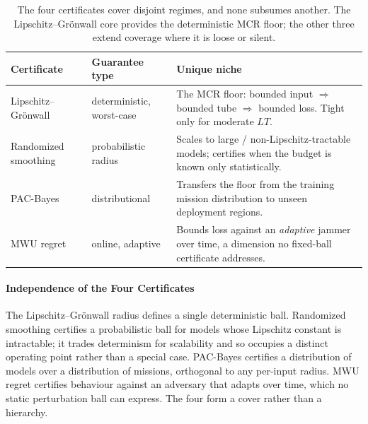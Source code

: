 \begin{table}[t]
\centering
\caption{The four certificates cover disjoint regimes, and none subsumes
another. The Lipschitz--Gr\"onwall core provides the deterministic MCR floor;
the other three extend coverage where it is loose or silent.}
\label{tab:certs}
\small
\renewcommand{\arraystretch}{1.05}
\begin{tabularx}{\columnwidth}{@{}
  >{\hsize=0.82\hsize\raggedright\arraybackslash}X
  >{\hsize=0.70\hsize\raggedright\arraybackslash}X
  >{\hsize=1.48\hsize\raggedright\arraybackslash}X@{}}
\toprule
\textbf{Certificate} & \textbf{Guarantee type} & \textbf{Unique niche}\\
\midrule
Lipschitz--Gr\"onwall & deterministic, worst-case & The MCR floor: bounded input $\Rightarrow$ bounded tube $\Rightarrow$ bounded loss. Tight only for moderate $LT$.\\
Randomized smoothing~\cite{cohen2019smoothing} & probabilistic radius & Scales to large / non-Lipschitz-tractable models; certifies when the budget is known only statistically.\\
PAC-Bayes~\cite{viallard2021pacbayes} & distributional & Transfers the floor from the training mission distribution to unseen deployment regions.\\
MWU regret~\cite{arora2012mwu,balcan2015commitment} & online, adaptive & Bounds loss against an \emph{adaptive} jammer over time, a dimension no fixed-ball certificate addresses.\\
\bottomrule
\end{tabularx}
\end{table}

\paragraph{Independence of the Four Certificates}
The Lipschitz--Gr\"onwall radius defines a single deterministic ball.
Randomized smoothing certifies a probabilistic ball for models whose Lipschitz
constant is intractable; it trades determinism for scalability and so occupies
a distinct operating point rather than a special case. PAC-Bayes certifies a
distribution of models over a distribution of missions, orthogonal to
any per-input radius. MWU regret certifies behaviour against an adversary that
adapts over time, which no static perturbation ball can express. The
four form a cover rather than a hierarchy.

